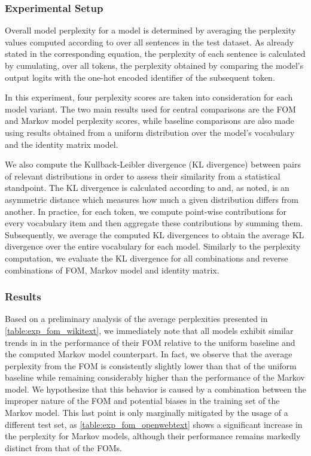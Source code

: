\subsubsection{Experimental Setup}

Overall model perplexity for a model is determined by averaging the perplexity values computed according to  over all sentences in the test dataset.
As already stated in the corresponding equation, the perplexity of each sentence is calculated by cumulating, over all tokens, the perplexity obtained by comparing the model's output logits with the one-hot encoded identifier of the subsequent token.

In this experiment, four perplexity scores are taken into consideration for each model variant.
The two main results used for central comparisons are the FOM and Markov model perplexity scores, while baseline comparisons are also made using results obtained from a uniform distribution over the model's vocabulary and the identity matrix model.

We also compute the Kullback-Leibler divergence (KL divergence) between pairs of relevant distributions in order to assess their similarity from a statistical standpoint.
The KL divergence is calculated according to  and, as noted, is an asymmetric distance which measures how much a given distribution differs from another.
In practice, for each token, we compute point-wise contributions for every vocabulary item and then aggregate these contributions by summing them.
Subsequently, we average the computed KL divergences to obtain the average KL divergence over the entire vocabulary for each model.
Similarly to the perplexity computation, we evaluate the KL divergence for all combinations and reverse combinations of FOM, Markov model and identity matrix. 

\subsubsection{Results}

Based on a preliminary analysis of the average perplexities presented in \cref{table:exp_fom_wikitext}, we immediately note that all models exhibit similar trends in in the performance of their FOM relative to the uniform baseline and the computed Markov model counterpart.
In fact, we observe that the average perplexity from the FOM is consistently slightly lower than that of the uniform baseline while remaining considerably higher than the performance of the Markov model.
We hypothesize that this behavior is caused by a combination between the improper nature of the FOM and potential biases in the training set of the Markov model.
This last point is only marginally mitigated by the usage of a different test set, as \cref{table:exp_fom_openwebtext} shows a significant increase in the perplexity for Markov models, although their performance remains markedly distinct from that of the FOMs.

